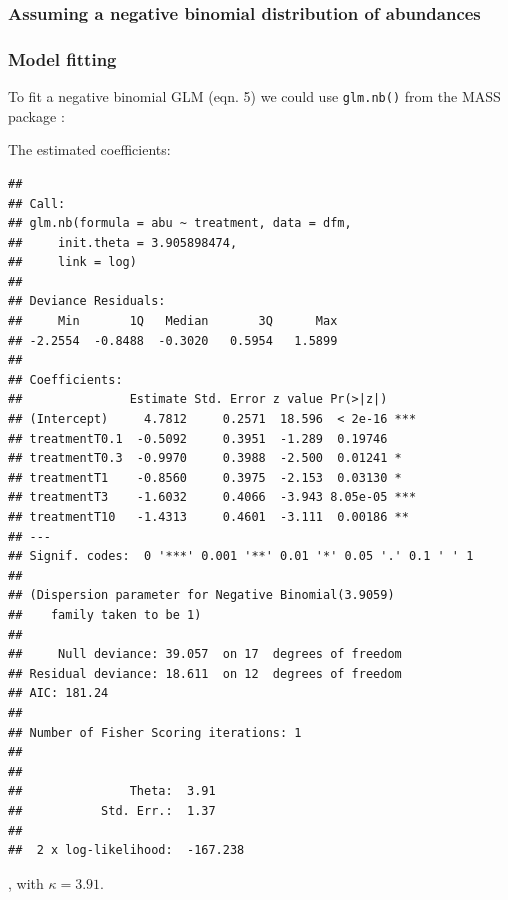 \subsubsection{Assuming a negative binomial distribution of abundances}
\subsubsection{Model fitting}
To fit a negative binomial GLM (eqn. 5) we could use \texttt{glm.nb()} from the MASS package \citep{venables_modern_2002}:
\begin{knitrout}
\color{fgcolor}\small\begin{kframe}
\begin{alltt}
 \hlkwb{<-}  \hlopt{~}   
\end{alltt}
\end{kframe}
\end{knitrout}

The estimated coefficients:
\begin{knitrout}
\color{fgcolor}\small\begin{kframe}
\begin{alltt}
\end{alltt}
\begin{verbatim}
## 
## Call:
## glm.nb(formula = abu ~ treatment, data = dfm, 
##     init.theta = 3.905898474, 
##     link = log)
## 
## Deviance Residuals: 
##     Min       1Q   Median       3Q      Max  
## -2.2554  -0.8488  -0.3020   0.5954   1.5899  
## 
## Coefficients:
##               Estimate Std. Error z value Pr(>|z|)    
## (Intercept)     4.7812     0.2571  18.596  < 2e-16 ***
## treatmentT0.1  -0.5092     0.3951  -1.289  0.19746    
## treatmentT0.3  -0.9970     0.3988  -2.500  0.01241 *  
## treatmentT1    -0.8560     0.3975  -2.153  0.03130 *  
## treatmentT3    -1.6032     0.4066  -3.943 8.05e-05 ***
## treatmentT10   -1.4313     0.4601  -3.111  0.00186 ** 
## ---
## Signif. codes:  0 '***' 0.001 '**' 0.01 '*' 0.05 '.' 0.1 ' ' 1
## 
## (Dispersion parameter for Negative Binomial(3.9059) 
##    family taken to be 1)
## 
##     Null deviance: 39.057  on 17  degrees of freedom
## Residual deviance: 18.611  on 12  degrees of freedom
## AIC: 181.24
## 
## Number of Fisher Scoring iterations: 1
## 
## 
##               Theta:  3.91 
##           Std. Err.:  1.37 
## 
##  2 x log-likelihood:  -167.238
\end{verbatim}
\end{kframe}
\end{knitrout}
, with $\kappa = 3.91$.


